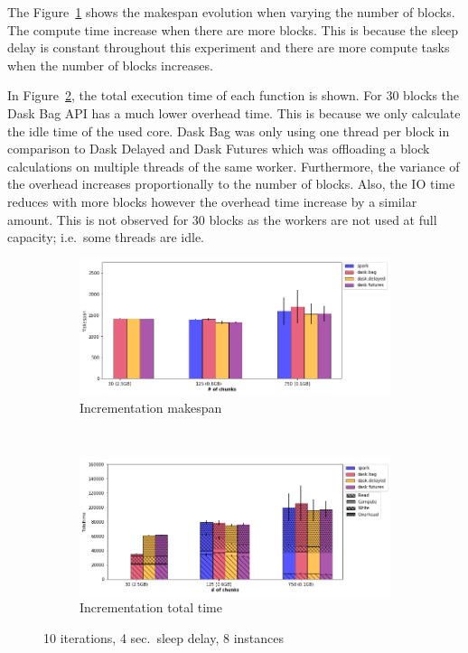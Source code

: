\documentclass[conference]{IEEEtran}
\begin{document}
The Figure~\ref{fig:inc_ms_block} shows the makespan evolution when varying the
number of blocks. The compute time increase when there are more blocks. This is
because the sleep delay is constant throughout this experiment and there are more
compute tasks when the number of blocks increases.

In Figure~\ref{fig:inc_tt_block}, the total execution time of each function is shown.
For 30 blocks the Dask Bag API has a much lower overhead time. This is because we
only calculate the idle time of the used core. Dask Bag was only using one thread per
block in comparison to Dask Delayed and Dask Futures which was offloading a block
calculations on multiple threads of the same worker. Furthermore, the variance of the
overhead increases proportionally to the number of blocks. Also, the IO time reduces
with more blocks however the overhead time increase by a similar amount. This is not
observed for 30 blocks as the workers are not used at full capacity; i.e.\ some
threads are idle.

\begin{figure}[!t]
    \centering
    \begin{subfigure}[b]{\columnwidth}
        \includegraphics[clip,width=\columnwidth]{images/inc_block.png}%
        \caption{Incrementation makespan}\label{fig:inc_ms_block}
    \end{subfigure}
    \\
    \begin{subfigure}[b]{\columnwidth}
        \includegraphics[clip,width=\columnwidth]{images/inc_idle_block.png}%
        \caption{Incrementation total time}\label{fig:inc_tt_block}
    \end{subfigure}
    \caption{10 iterations, 4 sec.\ sleep delay, 8 instances}\label{fig:inc_block}
\end{figure}
\end{document}
